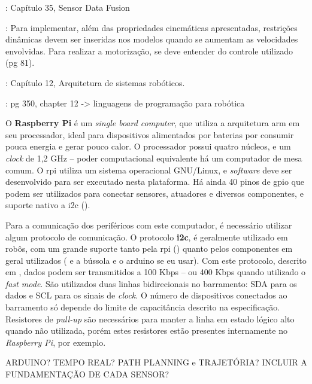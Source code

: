 \cite{siciliano2016springer}: Capítulo 35, Sensor Data Fusion

\cite{siegwart2011introduction}: Para implementar, além das propriedades cinemáticas apresentadas, restrições dinâmicas devem ser inseridas nos modelos quando se aumentam as velocidades envolvidas. Para realizar a motorização, se deve entender do controle utilizado (pg 81).

\cite{siciliano2016springer}: Capítulo 12, Arquitetura de sistemas robóticos.

\cite{craig2017introduction}: pg 350, chapter 12 -> linguagens de programação para robótica

O \textbf{Raspberry Pi} é um \emph{single board computer}, que utiliza a arquitetura \acrshort{arm} em seu processador, ideal para dispositivos alimentados por baterias por consumir pouca energia e gerar pouco calor. O processador possui quatro núcleos, e um \emph{clock} de 1,2 GHz -- poder computacional equivalente há um computador de mesa comum. O \acrshort{rpi} utiliza um sistema operacional GNU/Linux, e \emph{software} deve ser desenvolvido para ser executado nesta plataforma. Há ainda 40 pinos de \acrshort{gpio} que podem ser utilizados para conectar sensores, atuadores e diversos componentes, e suporte nativo a \acrshort{i2c} (\cite{upton2014raspberry}).


Para a comunicação dos periféricos com este computador, é necessário utilizar algum protocolo de comunicação. O protocolo \textbf{\acrlong{i2c}}, é geralmente utilizado em robôs, com um grande suporte tanto pela \acrshort{rpi} (\cite{upton2014raspberry}) quanto pelos componentes em geral utilizados (\cite{MPU6050} e a bússola e o arduino se eu usar). Com este protocolo, descrito em \cite{semiconductors2000i2c}, dados podem ser transmitidos a 100 Kbps -- ou 400 Kbps quando utilizado o \emph{fast mode}. São utilizados duas linhas bidirecionais no barramento: SDA para os dados e SCL para os sinais de \emph{clock}. O número de dispositivos conectados ao barramento só depende do limite de capacitância descrito na especificação. Resistores de \emph{pull-up} são necessários para manter a linha em estado lógico alto quando não utilizada, porém estes resistores estão presentes internamente no \emph{Raspberry Pi}, por exemplo.

ARDUINO? TEMPO REAL? PATH PLANNING e TRAJETÓRIA? INCLUIR A FUNDAMENTAÇÃO DE CADA SENSOR?

